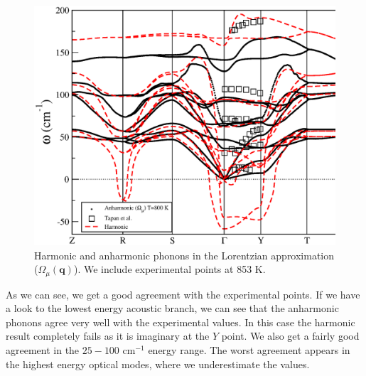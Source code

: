 \begin{figure}[h]
\includegraphics[width=\linewidth]{Figures/exp-vs-theory.eps}
\caption[Comparison of phonons in the Lorentzian approximation and INS experiments.]{Harmonic and anharmonic phonons in the Lorentzian approximation ($\Omega_{\mu}(\mathbf{q})$). We include experimental points\cite{chatterji2018soft} 
at 853 K.}
\label{phonon-exp}
\end{figure}
As we can see, we get a good agreement with the experimental points. If we have a look to the lowest energy acoustic branch, we can see that the anharmonic phonons agree very well with the experimental values. In this case the harmonic result completely fails as it is imaginary at the $Y$ point. We also get a fairly good agreement in the $25-100$ cm$^{-1}$ energy range. The worst agreement appears in the highest energy optical modes, where we underestimate the values. \\

